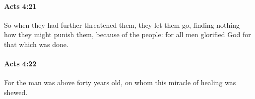		\paragraph{Acts 4:21} %
			\label{ACTS-4-21}

			So when they had further threatened them, they let them go, finding nothing how they might punish them, because of the people: for all men glorified God for that which was done.

			\begin{framed}
			\scriptsize
				\begin{compactdesc}
					\item[SBLG] 
				\end{compactdesc}
			\end{framed}

		\paragraph{Acts 4:22} %
			\label{ACTS-4-22}

			For the man was above forty years old, on whom this miracle of healing was shewed.

